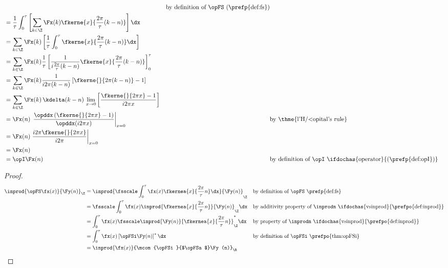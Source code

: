 \begin{proofns}
\begin{align*}
       &&    \text{by definition of $\opFS$ (\prefp{def:fs})}
     \\&=    \frac{1}{\tau} \int_0^\tau \left[ \sum_{k\in\Z} \Fx(k) \fkerne{x}{\frac{2\pi}{\tau}(k-n)}  \right]  \dx
     \\&=    \sum_{k\in\Z} \Fx(k) \left[ \frac{1}{\tau}  \int_0^\tau \fkerne{x}{\frac{2\pi}{\tau}(k-n)} \dx \right]  
     \\&=    \sum_{k\in\Z} \Fx(k) \frac{1}{\tau} \left[  \frac{1}{i\frac{2\pi}{\tau}(k-n)}  \fkerne{x}{\frac{2\pi}{\tau}(k-n)}\right]_0^\tau  
     \\&=    \sum_{k\in\Z} \Fx(k) \frac{1}{i2\pi(k-n)}\left[ \fkerne{}{2\pi(k-n)}-1  \right]  
     \\&=    \sum_{k\in\Z} \Fx(k) \, \kdelta(k-n)\, \lim_{x\to0}\left[\frac{\fkerne{}{2\pi x}-1 }{i2\pi x}\right]
     \\&=    \Fx(n) \, \left.\frac{\opddx\left(\fkerne{}{2\pi x}-1\right) }{\opddx(i2\pi x)}\right|_{x=0}
       &&    \text{by \thme{l'H{/<o}pital's rule}}
     \\&=    \Fx(n) \left.\frac{i2\pi\fkerne{}{2\pi x}}{i2\pi }\right|_{x=0}
     \\&=    \Fx(n) 
     \\&=    \opI \Fx(n)
       &&    \text{by definition of $\opI$ \ifdochas{operator}{(\prefp{def:opI})}} 
\end{align*}
\end{proofns}


\begin{theorem}
\label{thm:opFSa}
\end{theorem}
\begin{proof}
\begin{align*}
  \inprod{ \opFS \fx(x) }{ \Fy(n) }_{\Z}
    &= \inprod{ \fsscale \int_0^\tau \fx(x) \fkernea{x}{\frac{2\pi}{\tau}n} \dx }{ \Fy(n) }_{\Z}
    && \text{by definition of $\opFS$ \prefp{def:fs}}
  \\&= \fsscale \int_0^\tau \fx(x) \inprod{ \fkernea{x}{\frac{2\pi}{\tau}n} }{ \Fy(n) }_{\Z}  \dx
    && \text{by additivity property of $\inprodn$ \ifdochas{vsinprod}{\prefpo{def:inprod}}}
  \\&= \int_0^\tau \fx(x) \fsscale \inprod{ \Fy(n) }{ \fkernea{x}{\frac{2\pi}{\tau}n} }_{\Z}^\ast  \dx
    && \text{by property of $\inprodn$ \ifdochas{vsinprod}{\prefpo{def:inprod}}}
  \\&= \int_0^\tau \fx(x) \left[\opFSi\Fy(n)\right]^\ast  \dx
    && \text{by definition of $\opFSi$ \prefpo{thm:opFSi}}
  \\&= \inprod{\fx(x)}{\mcom{\opFSi}{$\opFSa$}\Fy(n)}_{\R}
\end{align*}
\end{proof}



